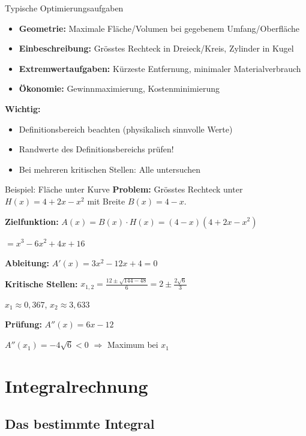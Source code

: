 \documentclass[a4paper,fontsize = 7pt]{scrartcl}
\begin{document}
\begin{mainbox}{Typische Optimierungsaufgaben}
\begin{itemize}
	\item \textbf{Geometrie:} Maximale Fläche/Volumen bei gegebenem Umfang/Oberfläche
	\item \textbf{Einbeschreibung:} Grösstes Rechteck in Dreieck/Kreis, Zylinder in Kugel
	\item \textbf{Extremwertaufgaben:} Kürzeste Entfernung, minimaler Materialverbrauch
	\item \textbf{Ökonomie:} Gewinnmaximierung, Kostenminimierung
\end{itemize}

\textbf{Wichtig:}
\begin{itemize}
	\item Definitionsbereich beachten (physikalisch sinnvolle Werte)
	\item Randwerte des Definitionsbereichs prüfen!
	\item Bei mehreren kritischen Stellen: Alle untersuchen
\end{itemize}
\end{mainbox}

\begin{subbox}{Beispiel: Fläche unter Kurve}
\textbf{Problem:} Grösstes Rechteck unter $H(x) = 4 + 2x - x^2$ mit Breite $B(x) = 4 - x$.

\textbf{Zielfunktion:} $A(x) = B(x) \cdot H(x) = (4-x)(4 + 2x - x^2)$

$= x^3 - 6x^2 + 4x + 16$

\textbf{Ableitung:} $A'(x) = 3x^2 - 12x + 4 = 0$

\textbf{Kritische Stellen:} $x_{1,2} = \frac{12 \pm \sqrt{144 - 48}}{6} = 2 \pm \frac{2\sqrt{6}}{3}$

$x_1 \approx 0{,}367$, $x_2 \approx 3{,}633$

\textbf{Prüfung:} $A''(x) = 6x - 12$

$A''(x_1) = -4\sqrt{6} < 0$ $\Rightarrow$ Maximum bei $x_1$
\end{subbox}

\section{Integralrechnung}

\subsection{Das bestimmte Integral}
\end{document}
